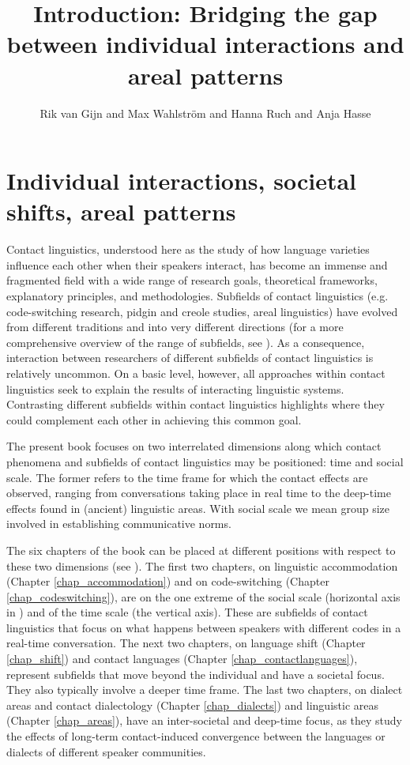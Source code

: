 \documentclass[output=paper]{langscibook}
\title[Introduction]{Introduction: Bridging the gap between individual interactions and areal patterns}
\author{Rik van Gijn\affiliation{Leiden University} and Max Wahlström\affiliation{University of Helsinki} and Hanna Ruch\affiliation{University of Zurich} and Anja Hasse\affiliation{University of Zurich}}
\begin{document}
\maketitle
\label{chap_intro}

\section{Individual interactions, societal shifts, areal patterns}

\begin{sloppypar}Contact linguistics, understood here as the study of how language varieties influence each other when their speakers interact, has become an immense and fragmented field with a wide range of research goals, theoretical frameworks, explanatory principles, and methodologies. Subfields of contact linguistics (e.g. code-switching research, pidgin and creole studies, areal linguistics) have evolved from different traditions and into very different directions (for a more comprehensive overview of the range of subfields, see \citealt{adamouetal2021routledge}). As a consequence, interaction between researchers of different subfields of contact linguistics is relatively uncommon. On a basic level, however, all approaches within contact linguistics seek to explain the results of interacting linguistic systems. Contrasting different subfields within contact linguistics highlights where they could complement each other in achieving this common goal.
\end{sloppypar}


The present book focuses on two interrelated dimensions along which contact phenomena and subfields of contact linguistics may be positioned: time and social scale. The former refers to the time frame for which the contact effects are observed, ranging from conversations taking place in real time to the deep-time effects found in (ancient) linguistic areas. With social scale we mean group size involved in establishing communicative norms.

The six chapters of the book can be placed at different positions with respect to these two dimensions (see ). The first two chapters, on linguistic accommodation (Chapter \ref{chap_accommodation}) and on code-switching (Chapter \ref{chap_codeswitching}), are on the one extreme of the social scale (horizontal axis in ) and of the time scale (the vertical axis). These are subfields of contact linguistics that focus on what happens between speakers with different codes in a real-time conversation. The next two chapters, on language shift (Chapter \ref{chap_shift}) and contact languages (Chapter \ref{chap_contactlanguages}), represent subfields that move beyond the individual and have a societal focus. They also typically involve a deeper time frame. The last two chapters, on dialect areas and contact dialectology (Chapter \ref{chap_dialects}) and linguistic areas (Chapter \ref{chap_areas}), have an inter-societal and deep-time focus, as they study the effects of long-term contact-induced convergence between the languages or dialects of different speaker communities. 
\end{document}
